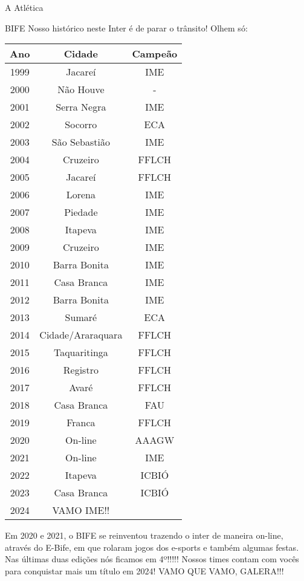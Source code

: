 \begin{secao}{A Atlética}
\begin{subsecao}{BIFE}
Nosso histórico neste Inter é de parar o trânsito! Olhem só:

\begin{center}
  \begin{tabular}{|c|c|c|}
   \hline
   Ano & Cidade & Campeão\\
   \hline
   1999 & Jacareí & IME\\
   2000 & Não Houve & - \\
   2001 & Serra Negra & IME\\
   2002 & Socorro & ECA\\
   2003 & São Sebastião & IME\\
   2004 & Cruzeiro & FFLCH\\
   2005 & Jacareí & FFLCH\\
   2006 & Lorena & IME\\
   2007 & Piedade & IME\\
   2008 & Itapeva & IME\\
   2009 & Cruzeiro & IME\\
   2010 & Barra Bonita & IME\\
   2011 & Casa Branca & IME\\
   2012 & Barra Bonita & IME\\
   2013 & Sumaré & ECA\\
   2014 & Cidade/Araraquara & FFLCH\\
   2015 & Taquaritinga & FFLCH\\
   2016 & Registro & FFLCH\\
   2017 & Avaré & FFLCH\\
   2018 & Casa Branca & FAU\\
   2019 & Franca & FFLCH\\
   2020 & On-line & AAAGW\\
   2021 & On-line & IME\\
   2022 & Itapeva & ICBIÓ\\
   2023 & Casa Branca & ICBIÓ\\
   2024 & VAMO IME!! & \\
   \hline
  \end{tabular}
\end{center}

Em 2020 e 2021, o BIFE se reinventou trazendo o inter de maneira on-line, através do
E-Bife, em que rolaram jogos dos e-sports e também algumas festas. Nas últimas 
duas edições nós ficamos em  4º!!!!! Nossos times contam com vocês para conquistar
mais um título em 2024! VAMO QUE VAMO, GALERA!!!



\end{subsecao}
\end{secao}

